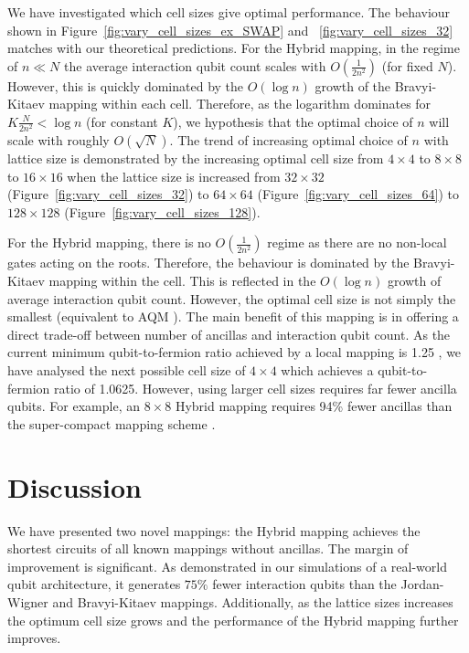 \documentclass[pdftex,pra,aps,twocolumn,twoside]{revtex4-2}
\theoremstyle{plain}
\theoremstyle{note}
\newcommand\+{{\footnotesize \raisebox{0.3ex}{+}}}
\begin{document}
We have investigated which cell sizes give optimal performance. The behaviour shown in Figure~\ref{fig:vary_cell_sizes_ex_SWAP} and ~\ref{fig:vary_cell_sizes_32} matches with our theoretical predictions. For the Hybrid mapping, in the regime of $n \ll N$ the average interaction qubit count scales with $O(\frac{1}{2n^2})$ (for fixed $N$). However, this is quickly dominated by the $O(\log n)$ growth of the Bravyi-Kitaev mapping within each cell. Therefore, as the logarithm dominates for $K\frac{N}{2n^2} < \log n$ (for constant $K$), we hypothesis that the optimal choice of $n$ will scale with roughly $O(\sqrt{N})$. The trend of increasing optimal choice of $n$ with lattice size is demonstrated by the increasing optimal cell size from $4\times 4$ to $8\times 8$ to $16 \times 16$ when the lattice size is increased from $32 \times 32$ (Figure~\ref{fig:vary_cell_sizes_32}) to $64 \times 64$ (Figure~\ref{fig:vary_cell_sizes_64}) to $128 \times 128$ (Figure~\ref{fig:vary_cell_sizes_128}).

For the Hybrid\+ mapping, there is no $O(\frac{1}{2n^2})$ regime as there are no non-local gates acting on the roots. Therefore, the behaviour is dominated by the Bravyi-Kitaev mapping within the cell. This is reflected in the $O(\log n)$ growth of average interaction qubit count. However, the optimal cell size is not simply the smallest (equivalent to AQM \cite{steudtner2019quantum}). The main benefit of this mapping is in offering a direct trade-off between number of ancillas and interaction qubit count. As the current minimum qubit-to-fermion ratio achieved by a local mapping is 1.25 \cite{chen2022equivalence}, we have analysed the next possible cell size of $4 \times 4$ which achieves a qubit-to-fermion ratio of 1.0625. However, using larger cell sizes requires far fewer ancilla qubits. For example, an $8 \times 8$ Hybrid\+ mapping requires 94\% fewer ancillas than the super-compact mapping scheme \cite{chen2022equivalence}.

\section{Discussion}
We have presented two novel mappings: the Hybrid mapping achieves the shortest circuits of all known mappings without ancillas. The margin of improvement is significant. As demonstrated in our simulations of a real-world qubit architecture, it generates $75\%$ fewer interaction qubits than the Jordan-Wigner and Bravyi-Kitaev mappings. Additionally, as the lattice sizes increases the optimum cell size grows and the performance of the Hybrid mapping further improves.
\end{document}
